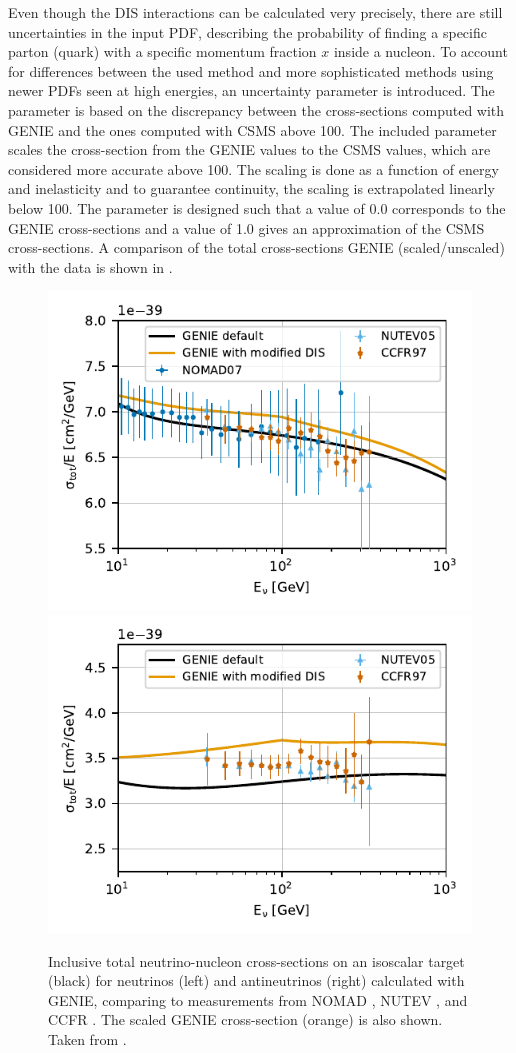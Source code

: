 Even though the DIS interactions can be calculated very precisely, there are still uncertainties in the input PDF, describing the probability of finding a specific parton (quark) with a specific momentum fraction $x$ inside a nucleon. To account for differences between the used method and more sophisticated methods using newer PDFs seen at high energies, an uncertainty parameter is introduced. The parameter is based on the discrepancy between the cross-sections computed with GENIE and the ones computed with CSMS  above \SI{100}{\gev}. The included parameter scales the cross-section from the GENIE values to the CSMS values, which are considered more accurate above \SI{100}{\gev}. The scaling is done as a function of energy and inelasticity and to guarantee continuity, the scaling is extrapolated linearly below \SI{100}{\gev}. The parameter is designed such that a value of 0.0 corresponds to the GENIE cross-sections and a value of 1.0 gives an approximation of the CSMS cross-sections. A comparison of the total cross-sections GENIE (scaled/unscaled) with the data is shown in .

\begin{figure}
    \centering 
    \includegraphics[width=0.49\linewidth]{figures/simulation_and_processing/cross_sections/NuMu_CC_iso_comp_to_data__upd_style.pdf}
    \includegraphics[width=0.49\linewidth]{figures/simulation_and_processing/cross_sections/NuMu_Bar_CC_iso_comp_to_data__upd_style.pdf}
    
    \caption[Inclusive total neutrino-nucleon cross-sections]{Inclusive total neutrino-nucleon cross-sections on an isoscalar target (black) for neutrinos (left) and antineutrinos (right) calculated with GENIE, comparing to measurements from NOMAD \cite{xsec_data_nomad}, NUTEV \cite{xsec_data_nutev}, and CCFR \cite{xsec_data_ccfr}. The scaled GENIE cross-section (orange) is also shown. Taken from \cite{OVS_PRD}.}
\end{figure}


